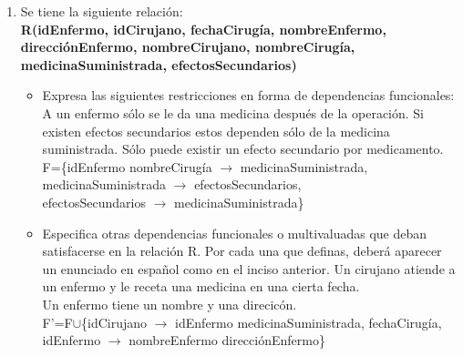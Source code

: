\documentclass[a4paper, 12pt]{report}
\begin{document}
\begin{enumerate}
\item Se tiene la siguiente relación:\\
    \textbf{R(idEnfermo, idCirujano, fechaCirugía, nombreEnfermo,
        direcciónEnfermo, nombreCirujano, nombreCirugía, medicinaSuministrada,
        efectosSecundarios)}
    \begin{itemize}
        \item Expresa las siguientes restricciones en forma de dependencias
            funcionales:
            A un enfermo sólo se le da una medicina después de la operación.
            Si existen efectos secundarios estos dependen sólo de la medicina
            suministrada. Sólo puede existir un efecto secundario por
            medicamento.\\
            F=\{idEnfermo nombreCirugía $\rightarrow$ medicinaSuministrada,\\
                medicinaSuministrada $\rightarrow$ efectosSecundarios,\\
                efectosSecundarios $\rightarrow$ medicinaSuministrada\}
        \item Especifica otras dependencias funcionales o multivaluadas que
            deban satisfacerse en la relación R. Por cada una que definas,
            deberá aparecer un enunciado en español como en el inciso anterior.
            Un cirujano atiende a un enfermo y le receta una medicina en una
            cierta fecha.\\
            Un enfermo tiene un nombre y una direcicón.\\
            F'=F$\cup$\{idCirujano $\rightarrow$ idEnfermo medicinaSuministrada,
                            fechaCirugía,\\
                        idEnfermo $\rightarrow$ nombreEnfermo direcciónEnfermo\}

    \end{itemize}
\end{enumerate}
\end{document}
